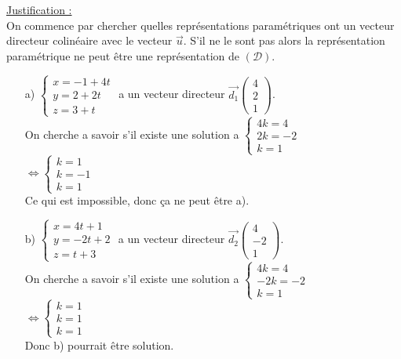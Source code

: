 \documentclass[a4paper, 12pt]{article}
\begin{document}
\noindent
\underline{Justification :}
\\
On commence par chercher quelles représentations paramétriques ont un vecteur directeur colinéaire avec le vecteur $\vec{u}$. S'il ne le sont pas alors la représentation paramétrique 
ne peut être une représentation de $(\mathcal{D})$. 
\vspace{3mm}
\begin{itemize}
    \item[a)] $\begin{cases} x = -1 + 4t \\ y = 2 + 2t \\ z = 3 + t \end{cases}$ a un vecteur directeur $\vec{d_1}\begin{pmatrix} 4 \\ 2 \\ 1 \end{pmatrix}$. 
        \\On cherche a savoir s'il existe une solution a $\begin{cases} 4k = 4 \\ 2k = -2 \\ k = 1 \end{cases}$
        \\
        $\iff \begin{cases} k = 1 \\ k = -1 \\k = 1 \end{cases}$ 
        \\Ce qui est impossible, donc ça ne peut être a). \vspace{5mm}
    
    \item[b)]  $\begin{cases} x = 4t + 1 \\ y = -2t + 2 \\ z = t + 3 \end{cases}$ a un vecteur directeur $\vec{d_2}\begin{pmatrix} 4 \\ -2 \\ 1 \end{pmatrix}$. 
        \\On cherche a savoir s'il existe une solution a $\begin{cases} 4k = 4 \\ -2k = -2 \\ k = 1 \end{cases}$ 
        \\ 
        $\iff \begin{cases} k = 1 \\ k = 1 \\k = 1 \end{cases}$ 
        \\Donc b) pourrait être solution. \vspace{5mm}


\end{itemize}
\end{document}
